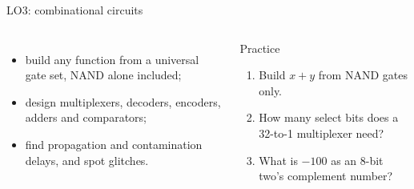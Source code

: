 \documentclass[10pt]{wosm-slides}
\begin{document}
\begin{frame}{LO3: combinational circuits}
  \begin{columns}[T, totalwidth=\textwidth]
      \begin{itemize}
        \item build any function from a universal gate set, NAND alone included;
        \item design multiplexers, decoders, encoders, adders and comparators;
        \item find propagation and contamination delays, and spot glitches.
      \end{itemize}
      \begin{block}{Practice}
        \begin{enumerate}
          \item Build $x + y$ from NAND gates only.\par
          \item How many select bits does a 32-to-1 multiplexer need?\par
          \item What is $-100$ as an 8-bit two's complement number?\par
        \end{enumerate}
      \end{block}
  \end{columns}
\end{frame}
\end{document}
